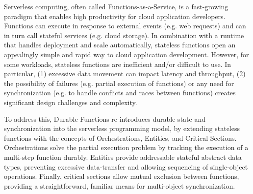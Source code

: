Serverless computing, often called Functions-as-a-Service, is a fast-growing paradigm that enables high productivity for cloud application developers. Functions can execute in response to external events (e.g. web requests) and can in turn call stateful services (e.g. cloud storage). In combination with a runtime that handles deployment and scale automatically, stateless functions open an appealingly simple and rapid way to cloud application development. However, for some workloads, stateless functions are inefficient and/or difficult to use. In particular, (1) excessive data movement can impact latency and throughput, (2) the possibility of failures (e.g. partial execution of functions) or any need for synchronization (e.g.  to handle conflicts and races between functions) creates significant design challenges and complexity.

To address this, Durable Functions re-introduces durable state and synchronization into the serverless programming model, by extending stateless functions with the concepts of Orchestrations, Entities, and Critical Sections. Orchestrations solve the partial execution problem by tracking the execution of a multi-step function durably. Entities provide addressable stateful abstract data types, preventing excessive data-transfer and allowing sequencing of single-object operations. Finally, critical sections allow mutual exclusion between functions, providing a straightforward, familiar means for multi-object synchronization.
